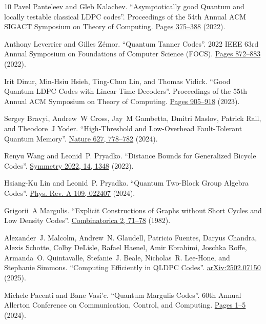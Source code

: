 \documentclass[a4paper,twocolumn,11pt,accepted=2026-05-03]{quantumarticle}
\begin{document}
\begin{thebibliography}{10}
Pavel Panteleev and Gleb Kalachev. ``Asymptotically good Quantum and locally testable classical LDPC codes''. Proceedings of the 54th Annual ACM SIGACT Symposium on Theory of Computing. \href{https://doi.org/10.1145/3519935.3520017}{Pages 375--388} (2022).

Anthony Leverrier and Gilles Zémor.
``Quantum {T}anner {C}odes''. 2022 IEEE 63rd Annual Symposium on Foundations of Computer Science (FOCS). \href{https://doi.org/10.1109/FOCS54457.2022.00117}{Pages 872--883} (2022).

 Irit Dinur, Min-Hsiu Hsieh, Ting-Chun Lin, and Thomas Vidick.
``Good {Quantum} {LDPC} {Codes} with {Linear} {Time} {Decoders}''. Proceedings of the 55th {Annual} {ACM} {Symposium} on {Theory} of {Computing}. \href{https://doi.org/10.1145/3564246.3585101}{Pages 905--918} (2023).

Sergey Bravyi, Andrew~W Cross, Jay~M Gambetta, Dmitri Maslov, Patrick Rall, and Theodore~J Yoder.
``High-{T}hreshold and {L}ow-{O}verhead {F}ault-{T}olerant {Q}uantum {M}emory''.
\href{https://doi.org/10.1038/s41586-024-07107-7}{Nature 627, 778–782} (2024).

Renyu Wang and Leonid~P. Pryadko.
 ``Distance {B}ounds for {G}eneralized {B}icycle {C}odes''. \href{https://doi.org/10.3390/sym14071348}{Symmetry 2022, 14, 1348} (2022).

Hsiang-Ku Lin and Leonid~P. Pryadko.
 ``Quantum {T}wo-{B}lock {G}roup {A}lgebra {C}odes''.
 \href{https://link.aps.org/doi/10.1103/PhysRevA.109.022407}{Phys. Rev. A 109, 022407} (2024).

Grigorii~A Margulis.
 ``Explicit {C}onstructions of {G}raphs without {S}hort {C}ycles and {L}ow {D}ensity {C}odes''.
 \href{https://doi.org/10.1007/BF02579283}{Combinatorica 2, 71–78} (1982).

 Alexander~J. Malcolm, Andrew~N. Glaudell, Patricio Fuentes, Daryus Chandra, Alexis Schotte, Colby DeLisle, Rafael Haenel, Amir Ebrahimi, Joschka Roffe, Armanda~O. Quintavalle, Stefanie~J. Beale, Nicholas~R. Lee-Hone, and Stephanie Simmons.
 ``Computing {E}fficiently in {QLDPC} {C}odes''. \href{https://arxiv.org/abs/2502.07150}{arXiv:2502.07150} (2025).

 Michele Pacenti and Bane Vasi'c.
 ``Quantum {M}argulis {C}odes''. 60th Annual Allerton Conference on Communication, Control, and Computing. \href{https://doi.org/10.1109/Allerton63246.2024.10735283}{Pages 1--5} (2024).


\end{thebibliography}
\end{document}
